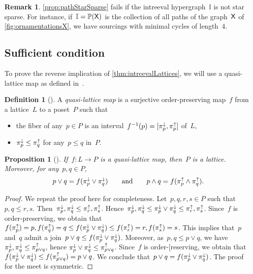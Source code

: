 \documentclass{amsart}
\newtheorem{proposition}[theorem]{Proposition}
\theoremstyle{definition}
\newtheorem{definition}[theorem]{Definition}
\newtheorem{remark}[theorem]{Remark}
\newcommand{\darkblue}{\color{darkblue}} %
\newcommand{\defn}[1]{\textsl{\darkblue #1}} %
\newcommand{\meet}{\wedge} %
\newcommand{\join}{\vee} %
\newcommand{\projDown}[1]{\smash{\pi^\downarrow_{#1}}} %
\newcommand{\projUp}[1]{\smash{\pi^\uparrow_{#1}}} %
\newcommand{\II}{\mathbb I} %
\newcommand{\PP}{\mathbb P} %
\newcommand{\Xgraph}{\sf X} %
\begin{document}
\begin{remark}
\cref{prop:pathStarSparse} fails if the intreeval hypergraph~$\II$ is not star sparse.
For instance, if~$\II = \PP(\Xgraph)$ is the collection of all paths of the graph~$\Xgraph$ of \cref{fig:ornamentationsX}, we have sourcings with minimal cycles of length~$4$.
\end{remark}


\subsection{Sufficient condition}
\label{subsec:sufficient}

To prove the reverse implication of \cref{thm:intreevalLattices}, we will use a quasi-lattice map as defined in~\cite[Rem.~4.14]{BergeronPilaud}.

\begin{definition}[{\cite[Rem.~4.14]{BergeronPilaud}}]
\label{def:quasiLatticeMap}
A \defn{quasi-lattice map} is a surjective order-preserving map~$f$ from a lattice~$L$ to a poset~$P$ such that
\begin{itemize}
\item the fiber of any~$p \in P$ is an interval~$f^{-1}(p) = [\projDown{p}, \projUp{p}]$ of~$L$,
\item $\projDown{p} \le \projUp{q}$ for any~$p \le q$ in~$P$.
\end{itemize}
\end{definition}

\begin{proposition}[{\cite[Rem.~4.14]{BergeronPilaud}}]
\label{prop:quasiLatticeMap}
If~$f : L \to P$ is a quasi-lattice map, then~$P$ is a lattice. 
Moreover, for any~$p,q \in P$,
\[
p \join q = f(\projDown{p} \join \projDown{q})
\qquad\text{and}\qquad
p \meet q = f(\projUp{p} \meet \projUp{q}).
\]
\end{proposition}

\begin{proof}
We repeat the proof here for completeness.
Let~$p,q,r,s \in P$ such that~$p, q \le r, s$.
Then~$\projDown{p}, \projDown{q} \le \projUp{r},  \projUp{s}$.
Hence~$\projDown{p}, \projDown{q} \le \projDown{p} \join \projDown{q} \le \projUp{r}, \projUp{s}$.
Since~$f$ is order-preserving, we obtain that~$f(\projUp{p}) = p, f(\projUp{q}) = q \le f(\projDown{p} \join \projDown{q}) \le f(\projUp{r}) = r, f(\projUp{s}) = s$.
This implies that~$p$ and~$q$ admit a join~$p \join q \le f(\projDown{p} \join \projDown{q})$.
Moreover, as~$p, q \le p \join q$, we have~$\projDown{p}, \projDown{q} \le \projUp{p \join q}$, hence $\projDown{p} \join \projDown{q} \le \projUp{p \join q}$.
Since~$f$ is order-[reserving, we obtain that~$f(\projDown{p} \join \projDown{q}) \le f(\projUp{p \join q}) = p \join q$.
We conclude that~$p \join q = f(\projDown{p} \join \projDown{q})$.
The proof for the meet is symmetric.
\end{proof}
\end{document}
